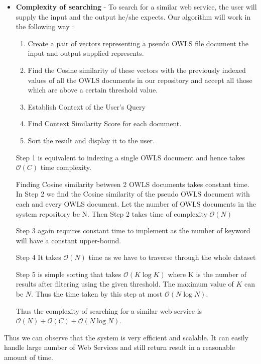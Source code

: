\documentclass[12pt, oneside]{book}
\begin{document}
\begin{itemize}
 \item \textbf{Complexity of searching} - To search for a similar web service, the user will supply the input and the output he/she expects. Our algorithm will work in the following way :
 \begin{enumerate}
  \item Create a pair of vectors representing a pseudo OWLS file document the input and output supplied represents.
  \item Find the Cosine similarity of these vectors with the previously indexed values of all the OWLS documents in our repository and accept all those which are above a certain threshold value.
  \item Establish Context of the User's Query
  \item Find Context Similarity Score for each document.
  \item Sort the result and display it to the user.
 \end{enumerate}
 Step 1 is equivalent to indexing a single OWLS document and hence takes $\mathcal{O}(C)$ time complexity. \\ \par
 Finding Cosine similarity between 2 OWLS documents takes constant time. In Step 2 we find the Cosine similarity of the pseudo OWLS document with each and every OWLS document. Let the number of OWLS documents in the system repository be N. Then Step 2 takes time of complexity $\mathcal{O}(N)$ \\ \par
 Step 3 again requires constant time to implement as the number of keyword will have a constant upper-bound. \\ \par
 Step 4 It takes $\mathcal{O}(N)$ time as we have to traverse through the whole dataset \\ \par
 Step 5 is simple sorting that takes $\mathcal{O}(K\log{K})$ where K is the number of results after filtering using the given threshold. The maximum value of $K$ can be $N$. Thus the time taken by this step at most $\mathcal{O}(N\log{N})$. \\ \par
 Thus the complexity of searching for a similar web service is $\mathcal{O}(N) + \mathcal{O}(C) + \mathcal{O}(N\log{N})$.
\end{itemize}
Thus we can observe that the system is very efficient and scalable. It can easily handle large number of Web Services and still return result in a reasonable amount of time.
\end{document}
